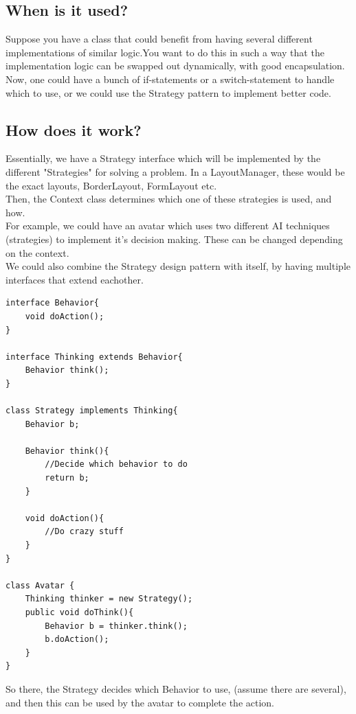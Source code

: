 \documentclass[12pt]{article}
\theoremstyle{definition}
\begin{document}
\subsection{When is it used?}
Suppose you have a class that could benefit from having several different implementations of similar logic.You want to do this in such a way that the implementation logic can be swapped out dynamically, with good encapsulation.
\\ \linebreak
Now, one could have a bunch of if-statements or a switch-statement to handle which to use, or we could use the Strategy pattern to implement better code.

\subsection{How does it work?}
Essentially, we have a Strategy interface which will be implemented by the different "Strategies" for solving a problem. In a LayoutManager, these would be the exact layouts, BorderLayout, FormLayout etc.
\\ \linebreak
Then, the Context class determines which one of these strategies is used, and how.
\\ \linebreak
For example, we could have an avatar which uses two different AI techniques (strategies) to implement it's decision making. These can be changed depending on the context.
\\ \linebreak
We could also combine the Strategy design pattern with itself, by having multiple interfaces that extend eachother.
\begin{lstlisting}
interface Behavior{
	void doAction();
}

interface Thinking extends Behavior{
	Behavior think();
}

class Strategy implements Thinking{
	Behavior b;
	
	Behavior think(){
		//Decide which behavior to do
		return b;
	}
	
	void doAction(){
		//Do crazy stuff
	}
}

class Avatar {
	Thinking thinker = new Strategy();
	public void doThink(){
		Behavior b = thinker.think();
		b.doAction();
	}
}
\end{lstlisting}
So there, the Strategy decides which Behavior to use, (assume there are several), and then this can be used by the avatar to complete the action.
\end{document}
